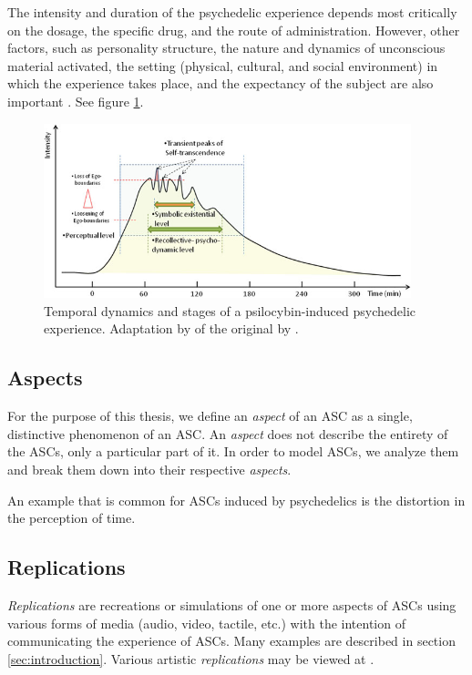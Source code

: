 The intensity and duration of the psychedelic experience depends most critically on the dosage, the specific drug, and the route of administration. However, other factors, such as personality structure, the nature and dynamics of unconscious material activated, the setting (physical, cultural, and social environment) in which the experience takes place, and the expectancy of the subject are also important \autocite{preller2016phenomenology}. See figure \ref{fig:temporal-dynamics}.

\begin{figure}[H]
    \centering
    \includegraphics[width=0.95\textwidth]{img/reused/preller2016phenomenology1.png}
    \caption{Temporal dynamics and stages of a psilocybin-induced psychedelic experience. Adaptation by \textcite{preller2016phenomenology} of the original by \textcite{leuner1962experimentelle}.}\label{fig:temporal-dynamics}
\end{figure}

\subsection{Aspects}
For the purpose of this thesis, we define an \textit{aspect} of an \ac{ASC} as a single, distinctive phenomenon of an \ac{ASC}. An \textit{aspect} does not describe the entirety of the \acp{ASC}, only a particular part of it. In order to model \acp{ASC}, we analyze them and break them down into their respective \textit{aspects}.

An example that is common for \acp{ASC} induced by psychedelics is the distortion in the perception of time.

\subsection{Replications}
\textit{Replications} are recreations or simulations of one or more aspects of \acp{ASC} using various forms of media (audio, video, tactile, etc.) with the intention of communicating the experience of \acp{ASC}. Many examples are described in section \ref{sec:introduction}. Various artistic \textit{replications} may be viewed at \textcite{pw2022replications}.

